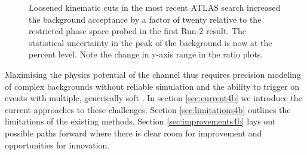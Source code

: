 \begin{figure}
  \begin{center}
    \hfill
    \caption{Loosened kinematic cuts in the most recent ATLAS search increased the background acceptance by a factor of twenty relative to the restricted phase space probed in the first Run-2 result.
      The statistical uncertainty in the peak of the background is now at the percent level. Note the change in y-axis range in the ratio plots.}
  \label{fig:2015vs20184b}
  \end{center}
\end{figure}

Maximising the physics potential of the \bbbb channel thus requires precision modeling of complex backgrounds without reliable simulation
and the ability to trigger on events with multiple, generically soft \bjets. In section \ref{sec:current4b} we introduce the current
approaches to these challenges. Section \ref{sec:limitations4b} outlines the limitations of the existing methods. Section \ref{sec:improvements4b}
lays out possible paths forward where there is clear room for improvement and opportunities for innovation. 

